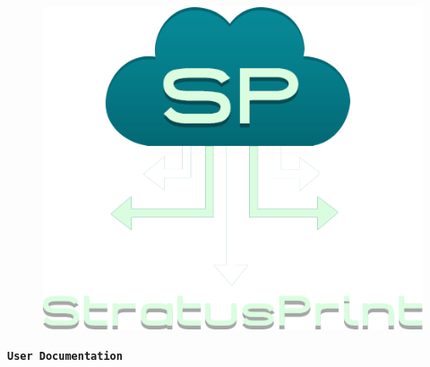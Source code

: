 \begin{titlepage}
\vspace*{\fill}
\pagecolor{titlepagecolor}
\color{white}

\begin{center}
\begin{figure}[!h]
   \centerline{\includegraphics[scale=0.6]{images/sp-logo-transparent}}
\end{figure}
\end{center}
\begin{center}

	\vspace{1.8em}

	\Huge\textbf{\texttt{User Documentation}} \textcolor{titlepagecolor!20}{\textsf{}}
\end{center}

\vspace*{\fill}
\end{titlepage}
